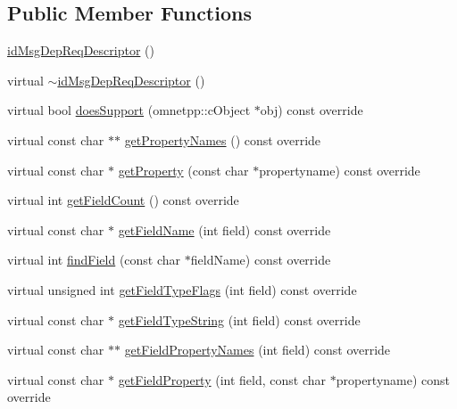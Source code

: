 \subsection*{Public Member Functions}
\begin{DoxyCompactItemize}
\item 
\hyperlink{classid_msg_dep_req_descriptor_a2f3ef90d3ded0e3218bbd9577c207dfa}{id\+Msg\+Dep\+Req\+Descriptor} ()
\item 
virtual \hyperlink{classid_msg_dep_req_descriptor_aee85d0507fe535a9dd7a5c793d0941ed}{$\sim$id\+Msg\+Dep\+Req\+Descriptor} ()
\item 
virtual bool \hyperlink{classid_msg_dep_req_descriptor_a866862bf6ada354e5f85cdd65c57f394}{does\+Support} (omnetpp\+::c\+Object $\ast$obj) const override
\item 
virtual const char $\ast$$\ast$ \hyperlink{classid_msg_dep_req_descriptor_a7150bb9f317973c98f118ba004de28cc}{get\+Property\+Names} () const override
\item 
virtual const char $\ast$ \hyperlink{classid_msg_dep_req_descriptor_a389f447ccbaba22709ec52b3ed5438f7}{get\+Property} (const char $\ast$propertyname) const override
\item 
virtual int \hyperlink{classid_msg_dep_req_descriptor_a36d7503463f93c4422429b63f94ba12e}{get\+Field\+Count} () const override
\item 
virtual const char $\ast$ \hyperlink{classid_msg_dep_req_descriptor_a7bb154c4ddb6234b3ada7a80e9d92cb8}{get\+Field\+Name} (int field) const override
\item 
virtual int \hyperlink{classid_msg_dep_req_descriptor_afb1d884343c3a15781c749a5d054cd7c}{find\+Field} (const char $\ast$field\+Name) const override
\item 
virtual unsigned int \hyperlink{classid_msg_dep_req_descriptor_acb44b456dc185a621c29b37511e58ae8}{get\+Field\+Type\+Flags} (int field) const override
\item 
virtual const char $\ast$ \hyperlink{classid_msg_dep_req_descriptor_aadee504ad5a0a6d979364cf1f30b2b39}{get\+Field\+Type\+String} (int field) const override
\item 
virtual const char $\ast$$\ast$ \hyperlink{classid_msg_dep_req_descriptor_ab8386cc6ce60e9aa43a48e39029ead08}{get\+Field\+Property\+Names} (int field) const override
\item 
virtual const char $\ast$ \hyperlink{classid_msg_dep_req_descriptor_af6ee434f614562190431baafbadc2df6}{get\+Field\+Property} (int field, const char $\ast$propertyname) const override

\end{DoxyCompactItemize}
